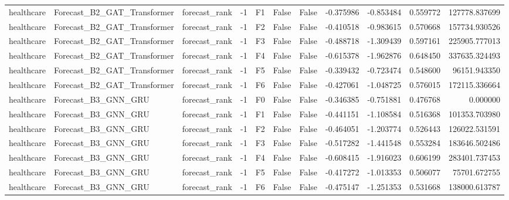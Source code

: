 \begin{tabular}{lllrlllrrrr}
healthcare &  Forecast\_B2\_GAT\_Transformer & forecast\_rank &    -1 &  F1 &           False &            False & -0.375986 & -0.853484 & 0.559772 &    127778.837699 \\
healthcare &  Forecast\_B2\_GAT\_Transformer & forecast\_rank &    -1 &  F2 &           False &            False & -0.410518 & -0.983615 & 0.570668 &    157734.930526 \\
healthcare &  Forecast\_B2\_GAT\_Transformer & forecast\_rank &    -1 &  F3 &           False &            False & -0.488718 & -1.309439 & 0.597161 &    225905.777013 \\
healthcare &  Forecast\_B2\_GAT\_Transformer & forecast\_rank &    -1 &  F4 &           False &            False & -0.615378 & -1.962876 & 0.648450 &    337635.324493 \\
healthcare &  Forecast\_B2\_GAT\_Transformer & forecast\_rank &    -1 &  F5 &           False &            False & -0.339432 & -0.723474 & 0.548600 &     96151.943350 \\
healthcare &  Forecast\_B2\_GAT\_Transformer & forecast\_rank &    -1 &  F6 &           False &            False & -0.427061 & -1.048725 & 0.576015 &    172115.336664 \\
healthcare &          Forecast\_B3\_GNN\_GRU & forecast\_rank &    -1 &  F0 &           False &            False & -0.346385 & -0.751881 & 0.476768 &         0.000000 \\
healthcare &          Forecast\_B3\_GNN\_GRU & forecast\_rank &    -1 &  F1 &           False &            False & -0.441151 & -1.108584 & 0.516368 &    101353.703980 \\
healthcare &          Forecast\_B3\_GNN\_GRU & forecast\_rank &    -1 &  F2 &           False &            False & -0.464051 & -1.203774 & 0.526443 &    126022.531591 \\
healthcare &          Forecast\_B3\_GNN\_GRU & forecast\_rank &    -1 &  F3 &           False &            False & -0.517282 & -1.441548 & 0.553284 &    183646.502486 \\
healthcare &          Forecast\_B3\_GNN\_GRU & forecast\_rank &    -1 &  F4 &           False &            False & -0.608415 & -1.916023 & 0.606199 &    283401.737453 \\
healthcare &          Forecast\_B3\_GNN\_GRU & forecast\_rank &    -1 &  F5 &           False &            False & -0.417272 & -1.013353 & 0.506077 &     75701.672755 \\
healthcare &          Forecast\_B3\_GNN\_GRU & forecast\_rank &    -1 &  F6 &           False &            False & -0.475147 & -1.251353 & 0.531668 &    138000.613787 \\

\end{tabular}

